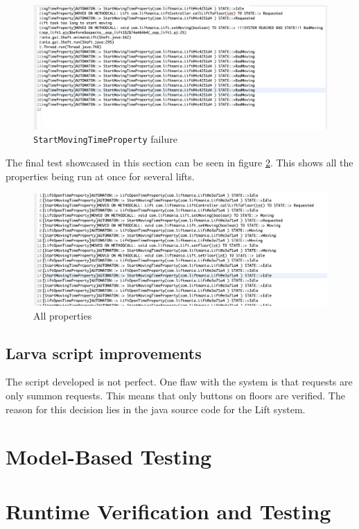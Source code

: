 \documentclass[a4paper, 12pt]{article}
\begin{document}
\begin{figure}[h]
   \centering
   \includegraphics[width=\textwidth,height=\textheight,keepaspectratio]{images/start-moving-time-property-failed} %
   \caption{\texttt{StartMovingTimeProperty} failure}
   \label{fig:start-moving-time-property-failed}
\end{figure}

The final test showcased in this section can be seen in figure \ref{fig:all-properties}. This shows all the properties being run at once for several lifts. 

\begin{figure}[h]
   \centering
   \includegraphics[width=\textwidth,height=\textheight,keepaspectratio]{images/all-properties} %
   \caption{All properties}
   \label{fig:all-properties}
\end{figure}

\subsection{Larva script improvements}
The script developed is not perfect. One flaw with the system is that requests are only summon requests. This means that only buttons on floors are verified. The reason for this decision lies in the java source code for the Lift system. 


\section{Model-Based Testing}

\section{Runtime Verification and Testing}


 
\end{document}
